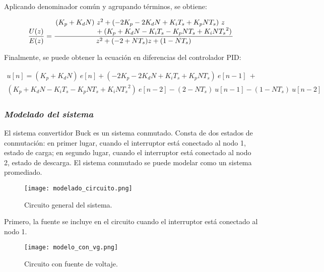 Aplicando denominador común y agrupando términos, se obtiene:

\vspace{-0.5cm}
\begin{equation}
    \dfrac{U(z)}{E(z)} =
    \frac
    {
        \splitfrac{
            (K_p + K_d N)\ z^2 + (-2 K_p - 2 K_d N + K_i T_s + K_p N T_s)\ z
        }{
            + (K_p + K_d N - K_i T_s - K_p N T_s + K_i N {T_s}^2)
        }
    }
    {
            z^2 + (-2 + N T_s) z + (1 - N T_s)
    }
    \end{equation}
\vspace{-0.5cm}

Finalmente, se puede obtener la ecuación en diferencias del controlador PID:

\vspace{-0.5cm}
\begin{multline}
        u[n] = (K_p + K_d N)\ e[n] + (-2 K_p - 2 K_d N + K_i T_s + K_p N T_s)\ e[n-1]\  + \\
    (K_p + K_d N - K_i T_s - K_p N T_s + K_i N {T_s}^2)\ e[n-2] - (2 - N T_s)\ u[n-1] - (1 - N T_s)\ u[n-2]
\end{multline}
\vspace{-0.5cm}

\subsubsection*{\it{Modelado del sistema}}
\vspace{-0.25cm}

El sistema convertidor Buck es un sistema conmutado. Consta de dos estados de conmutación: 
en primer lugar, cuando el interruptor está conectado al nodo 1, estado de carga; en segundo lugar, cuando
el interruptor está conectado al nodo 2, estado de descarga.
El sistema conmutado se puede modelar como un sistema promediado.

\begin{figure}[H]
    \centering
    \texttt{[image: modelado\_circuito.png]}
    \vspace{-0.25cm}
    \caption{Circuito general del sistema.}
    \label{fig:modelado_circuito}
\end{figure}

Primero, la fuente se incluye en el circuito cuando el interruptor está conectado al nodo 1.

\begin{figure}[H]
    \centering
    \texttt{[image: modelo\_con\_vg.png]}
    \vspace{-0.25cm}
    \caption{Circuito con fuente de voltaje.}
    \label{fig:modelado_con_vg}
\end{figure}

